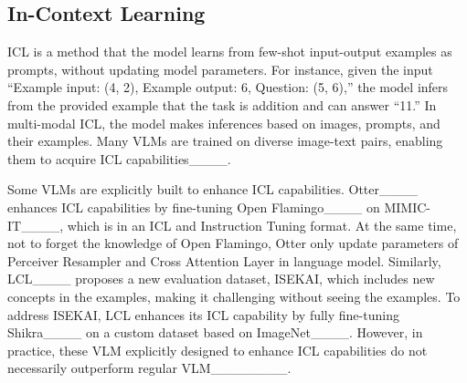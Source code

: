 \model


\subsection{In-Context Learning}
\label{sec:icl}
ICL is a method that the model learns from few-shot input-output examples as prompts, without updating model parameters.
% 
For instance, given the input ``Example input: (4, 2), Example output: 6, Question: (5, 6),'' the model infers from the provided example that the task is addition and can answer ``11.''
% 
In multi-modal ICL, the model makes inferences based on images, prompts, and their examples.
% 
Many VLMs are trained on diverse image-text pairs, enabling them to acquire ICL capabilities____.

Some VLMs are explicitly built to enhance ICL capabilities.
% 
Otter____ enhances ICL capabilities by fine-tuning Open Flamingo____ on MIMIC-IT____, which is in an ICL and Instruction Tuning format. 
% 
At the same time, not to forget the knowledge of Open Flamingo, Otter only update parameters of Perceiver Resampler and Cross Attention Layer in language model.
% 
Similarly, LCL____ proposes a new evaluation dataset, ISEKAI, which includes new concepts in the examples, making it challenging without seeing the examples.
% 
To address ISEKAI, LCL enhances its ICL capability by fully fine-tuning Shikra____ on a custom dataset based on ImageNet____.
% 
However, in practice, these VLM explicitly designed to enhance ICL capabilities do not necessarily outperform regular VLM________.